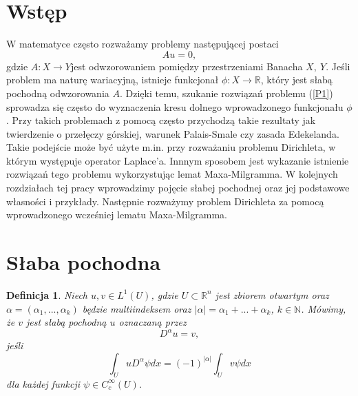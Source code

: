 \documentclass[12pt,a4paper,oneside,titlepage]{article}
\newtheorem{Def}{Definicja}
\begin{document}
\section{Wstęp}

W matematyce często rozważamy problemy następującej postaci
\begin{equation}
\label{P1}
Au = 0,
\end{equation}
gdzie $A:X \rightarrow  Y$jest odwzorowaniem pomiędzy przestrzeniami Banacha $X,~Y$. Jeśli problem ma naturę wariacyjną, istnieje funkcjonał $\phi : X \rightarrow \mathbb{R}$, który jest słabą pochodną odwzorowania $A$. Dzięki temu, szukanie rozwiązań problemu (\ref{P1}) sprowadza się często do wyznaczenia kresu dolnego wprowadzonego funkcjonału $\phi$. Przy takich problemach z pomocą często przychodzą takie rezultaty jak twierdzenie o przełęczy górskiej, warunek Palais-Smale czy zasada Edekelanda. Takie podejście może być użyte m.in. przy rozważaniu problemu Dirichleta, w którym występuje operator Laplace'a. Innnym sposobem jest wykazanie istnienie rozwiązań tego problemu wykorzystując lemat Maxa-Milgramma. W kolejnych rozdziałach tej pracy wprowadzimy pojęcie słabej pochodnej oraz jej podstawowe własności i przykłady. Następnie rozważymy problem Dirichleta za pomocą wprowadzonego wcześniej lematu Maxa-Milgramma.
\section{Słaba pochodna}
\begin{Def}
Niech $u, v \in L^{1}(U)$, gdzie $U \subset \mathbb{R}^{n}$ jest zbiorem otwartym oraz $\alpha = (\alpha_1, ..., \alpha_k)$ będzie multiindeksem oraz $\vert \alpha \vert = \alpha_1 + ... + \alpha_k$, $k \in \mathbb{N}$. Mówimy, że $v$ jest słabą pochodną $u$ oznaczaną przez
\begin{equation}
D^{\alpha} u =v,
\end{equation}
 jeśli 
\begin{equation}
\int_{U} u D^{\alpha}\psi dx = (-1)^{\vert \alpha \vert} \int_{U} v \psi dx
\end{equation} 
dla każdej funkcji $\psi \in C^{\infty}_{c}(U)$.
\end{Def}
\end{document}
